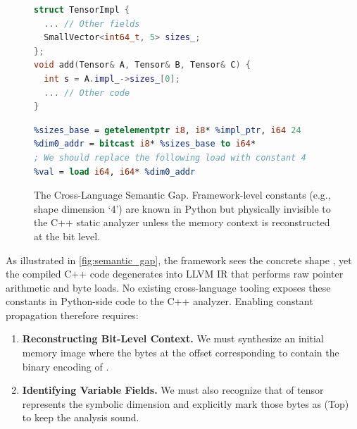 \begin{figure}[htbp]
\begin{minipage}{0.5\textwidth}
\begin{lstlisting}[language=C++, caption={C++ Implementation of the operator \kw{add}}, label={lst:cpp_view}, frame=tlrb]
struct TensorImpl {
  ... // Other fields
  SmallVector<int64_t, 5> sizes_;
};
void add(Tensor& A, Tensor& B, Tensor& C) {
  int s = A.impl_->sizes_[0]; 
  ... // Other code
}
\end{lstlisting}
\end{minipage}
\hfill
\begin{minipage}{0.47\textwidth}
\begin{lstlisting}[language=llvm, caption={LLVM IR of the operator \kw{add}}, label={lst:llvm_view}, frame=tlrb]
%impl_ptr = load %struct.TensorImpl*, %struct.Tensor* %a_ptr
%sizes_base = getelementptr i8, i8* %impl_ptr, i64 24
%dim0_addr = bitcast i8* %sizes_base to i64*
; We should replace the following load with constant 4
%val = load i64, i64* %dim0_addr
\end{lstlisting}
\end{minipage}
\caption{The Cross-Language Semantic Gap. Framework-level constants (e.g., shape dimension `4') are known in Python but physically invisible to the C++ static analyzer unless the memory context is reconstructed at the bit level.}
\label{fig:semantic_gap}
\end{figure}

As illustrated in \autoref{fig:semantic_gap}, the framework sees the concrete shape \kw{[4]}, yet the compiled C++ code degenerates into LLVM IR that performs raw pointer arithmetic and byte loads.
No existing cross-language tooling exposes these constants in Python-side code to the C++ analyzer. 
Enabling constant propagation therefore requires:
\begin{enumerate}
    \item \textbf{Reconstructing Bit-Level Context.} We must synthesize an initial memory image where the bytes at the offset corresponding to  contain the binary encoding of .
    \item \textbf{Identifying Variable Fields.} We must also recognize that  of tensor  represents the symbolic dimension  and explicitly mark those bytes as  (Top) to keep the analysis sound.
\end{enumerate}

